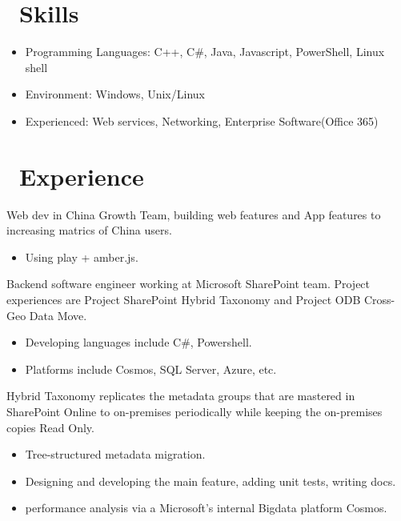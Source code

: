\documentclass{resume}
\begin{document}



\section{\faCogs\ Skills}
\begin{itemize}[parsep=0.5ex]
  \item Programming Languages: C++, C\#, Java, Javascript, PowerShell, Linux shell
  \item Environment: Windows, Unix/Linux
  \item Experienced: Web services, Networking, Enterprise Software(Office 365)
\end{itemize}

\section{\faUsers\ Experience}
 {}
Web dev in China Growth Team, building web features and App features to increasing matrics of China users.
\begin{itemize}
\item Using play + amber.js.
\end{itemize}

 {}
Backend software engineer working at Microsoft SharePoint team. Project experiences are Project SharePoint Hybrid Taxonomy and Project ODB Cross-Geo Data Move.
\begin{itemize}
\item Developing languages include C\#, Powershell.
\item Platforms include Cosmos, SQL Server, Azure, etc.
\end{itemize}

Hybrid Taxonomy replicates the metadata groups that are mastered in SharePoint Online to on-premises periodically
while keeping the on-premises copies Read Only.
\begin{itemize}
  \item Tree-structured metadata migration.
  \item Designing and developing the main feature, adding unit tests, writing docs.
  \item performance analysis via a Microsoft's internal Bigdata platform Cosmos.
\end{itemize}
\end{document}

